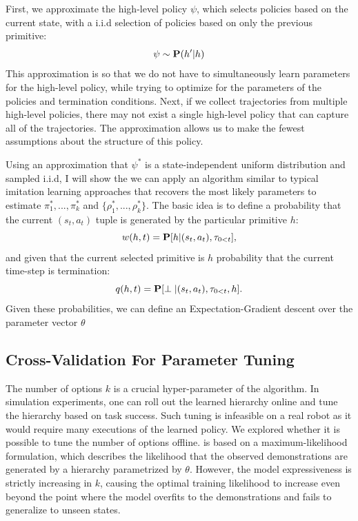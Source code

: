 
First, we approximate the high-level policy $\psi$, which selects policies based on the current state, with a i.i.d selection of policies based on only the previous primitive:
\[
\psi \sim \mathbf{P}(h' \vert h)
\]
This approximation is so that we do not have to simultaneously learn parameters for the high-level policy, while trying to optimize for the parameters of the policies and termination conditions.
Next, if we collect trajectories from multiple high-level policies, there may not exist a single high-level policy that can capture all of the trajectories.
The approximation allows us to make the fewest assumptions about the structure of this policy.

Using an approximation that $\psi^*$ is a state-independent uniform distribution and sampled i.i.d, I will show the we can apply an algorithm similar to typical imitation learning approaches that recovers the most likely parameters to estimate $\pi^*_{1},...,\pi^*_{k}$ and $\{\rho^*_{1},...,\rho^*_{k}\}$. The basic idea is to define a probability that the current $(s_t,a_t)$ tuple is generated by the particular primitive $h$:
\[
w(h,t) = \mathbf{P}[h \vert (s_t, a_t), \tau_{0<t}],
\]
and given that the current selected primitive is $h$ probability that the current time-step is termination:
\[
q(h,t) = \mathbf{P}[\perp \vert (s_t, a_t), \tau_{0<t}, h].
\]
Given these probabilities, we can define an Expectation-Gradient descent over the parameter vector $\theta$

\subsection*{Cross-Validation For Parameter Tuning}
The number of options $k$ is a crucial hyper-parameter of the algorithm.
In simulation experiments, one can roll out the learned hierarchy online and tune the hierarchy based on task success.
Such tuning is infeasible on a real robot as it would require many executions of the learned policy.
We explored whether it is possible to tune the number of options offline.
\alg is based on a maximum-likelihood formulation, which describes the likelihood that the observed demonstrations are generated by a hierarchy parametrized by $\theta$.
However, the model expressiveness is strictly increasing in $k$, causing the optimal training likelihood to increase even beyond the point where the model overfits to the demonstrations and fails to generalize to unseen states.

